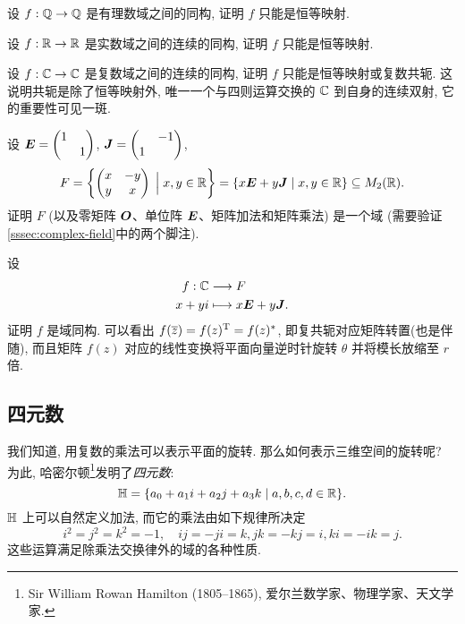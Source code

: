 \begin{exlist}
  \item 设 $f:{\mathbb{Q}}\to{\mathbb{Q}}$ 是有理数域之间的同构, 证明 $f$ 只能是恒等映射.
  \item 设 $f:{\mathbb{R}}\to{\mathbb{R}}$ 是实数域之间的连续的同构, 证明 $f$ 只能是恒等映射.
  \item 设 $f:{\mathbb{C}}\to{\mathbb{C}}$ 是复数域之间的连续的同构, 证明 $f$ 只能是恒等映射或复数共轭.
  这说明共轭是除了恒等映射外, 唯一一个与四则运算交换的 ${\mathbb{C}}$ 到自身的连续双射, 它的重要性可见一斑.
  \item 设 ${\boldsymbol{E}}=\begin{pmatrix}1& \\&1\end{pmatrix}$,
  ${\boldsymbol{J}}=\begin{pmatrix}&-1\\1&\end{pmatrix}$,
  \[F={\left\{\begin{pmatrix}
    x&-y\\y&x\end{pmatrix}\;\Big|\; x,y\in{\mathbb{R}}\right\}}
    ={\left\{x{\boldsymbol{E}}+y{\boldsymbol{J}}\mid x,y\in{\mathbb{R}}\right\}}\subseteq M_2({\mathbb{R}}).\]
  证明 $F$ (以及零矩阵 ${\boldsymbol{O}}$、单位阵 ${\boldsymbol{E}}$、矩阵加法和矩阵乘法) 是一个域 (需要验证\ref{sssec:complex-field}中的两个脚注).
  \item 设
  \begin{align*}
    f:{\mathbb{C}}&\longrightarrow F\\
    x+yi&\longmapsto x{\boldsymbol{E}}+y{\boldsymbol{J}}.
  \end{align*}
  证明 $f$ 是域同构.
  可以看出 $f(\overline z)=f(z)^{\mathrm{T}}=f(z)^*$, 即复共轭对应矩阵转置(也是伴随), 而且矩阵 $f(z)$ 对应的线性变换将平面向量逆时针旋转 $\theta$ 并将模长放缩至 $r$ 倍.
\end{exlist}




\subsection{四元数}

我们知道, 用复数的乘法可以表示平面的旋转.
那么如何表示三维空间的旋转呢?
为此, 哈密尔顿\footnote{
  Sir William Rowan Hamilton (1805--1865), 爱尔兰数学家、物理学家、天文学家.}发明了\emph{四元数}:
\[{\mathbb{H}}=\{a_0+a_1i+a_2j+a_3k\mid a,b,c,d\in{\mathbb{R}}\}.\]
${\mathbb{H}}$ 上可以自然定义加法, 而它的乘法由如下规律所决定
\[i^2=j^2=k^2=-1,\quad ij=-ji=k,jk=-kj=i,ki=-ik=j.\]
这些运算满足除乘法交换律外的域的各种性质.

